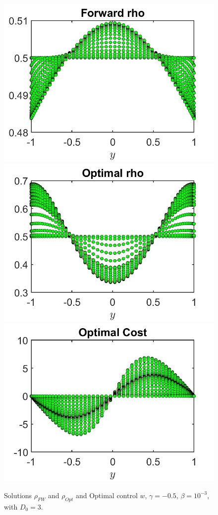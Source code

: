 \documentclass[11pt, a4paper]{article}
\theoremstyle{definition}
\begin{document}
\begin{figure}[h]
	\includegraphics[scale=0.3]{rhoFW0305D03.jpg}	\includegraphics[scale=0.3]{rhoOpt0305D03.jpg}
	\includegraphics[scale=0.3]{wOpt0305D03.jpg}
	\caption{Solutions $\rho_{FW}$ and $\rho_{Opt}$ and Optimal control $w$, $\gamma = - 0.5$, $\beta = 10^{-3}$, with $D_0 = 3$.}
	\label{rho00305D03}
\end{figure}
\end{document}
